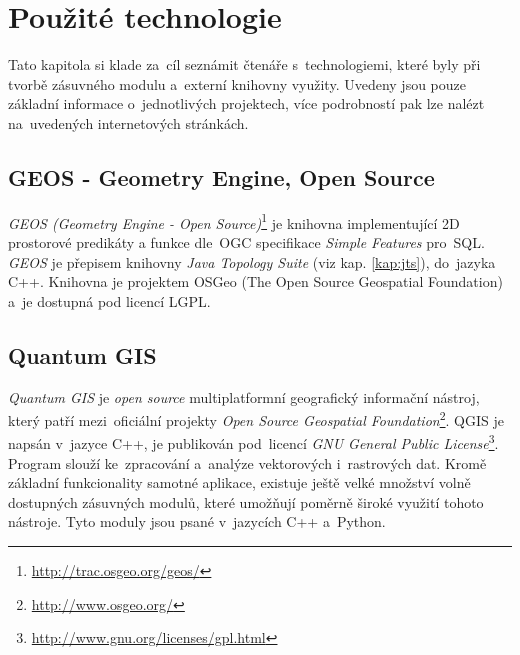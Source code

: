 \chapter{Použité technologie}
\label{4-technologie}

Tato kapitola si klade za~cíl seznámit čtenáře s~technologiemi, které byly 
při tvorbě zásuvného modulu a~externí knihovny využity. Uvedeny jsou pouze
základní informace o~jednotlivých projektech, více podrobností pak lze
nalézt na~uvedených internetových stránkách.


\section{GEOS - Geometry Engine, Open Source}
\label{geos}

\textit{GEOS (Geometry Engine - Open Source)}\footnote{\url{http://trac.osgeo.org/geos/}} 
je knihovna implementující 2D prostorové predikáty a funkce dle~OGC 
specifikace \textit{Simple Features} pro~SQL. \textit{GEOS} je přepisem 
knihovny \textit{Java Topology Suite} (viz kap. \ref{kap:jts}), do~jazyka 
C++. Knihovna je projektem OSGeo (The Open Source Geospatial Foundation) 
a~je dostupná pod licencí LGPL.

% 

\section{Quantum GIS}
\label{qgis}

\textit{Quantum GIS} je \textit{open source} multiplatformní geografický 
informační nástroj, který patří mezi~oficiální projekty \textit{Open Source 
Geospatial Foundation}\footnote{\url{http://www.osgeo.org/}}. QGIS je 
napsán v~jazyce C++, je publikován pod~licencí \textit{GNU General Public 
License}\footnote{\url{http://www.gnu.org/licenses/gpl.html}}. Program slouží 
ke~zpracování a~analýze vektorových i~rastrových dat. Kromě základní 
funkcionality samotné aplikace, existuje ještě velké množství volně 
dostupných zásuvných modulů, které umožňují poměrně široké využití 
tohoto nástroje. Tyto moduly jsou psané v~jazycích C++ a~Python.

